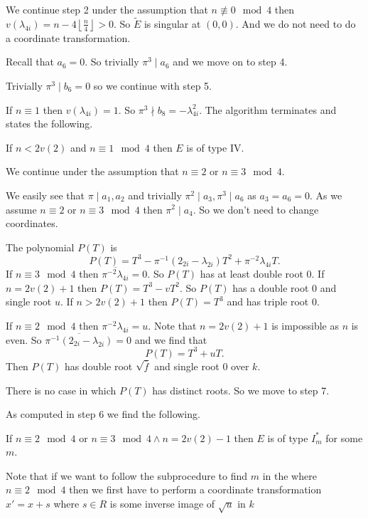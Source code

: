 We continue step 2 under the assumption that $n \not\equiv 0 \mod 4$ then $v(\lambda_{4i}) = n - 4 \left\lfloor \frac{n}{4} \right\rfloor >  0$. 
So $\tilde E$ is singular at $(0, 0)$. And we do not need to do a coordinate transformation. 



Recall that $a_6 = 0$. So trivially $\pi^3 \mid a_6$ and we move on to step 4.

Trivially $\pi^3 \mid b_6 = 0$ so we continue with step 5.

If $n \equiv 1$ then $v(\lambda_{4i}) = 1$. So $\pi^3 \nmid b_8 = - \lambda_{4i}^2$. 
The algorithm terminates and states the following. 
\begin{tateconclusion}
	If $n < 2v(2)$ and $n \equiv 1 \mod 4$ then $E$ is of type  $\mathrm {IV}$. 
\end{tateconclusion}
We continue under the assumption that $n \equiv 2$ or $n \equiv 3 \mod 4$. 

We easily see that $\pi \mid a_1, a_2$ and trivially $\pi^2 \mid a_3, \pi^3 \mid a_6$ as $a_3 = a_6 = 0$. 
As we assume $n \equiv 2$ or $n \equiv 3 \mod 4$ then $\pi^2 \mid a_4$. 
So we don't need to change coordinates. 

The polynomial $P(T)$ is \[
	P(T) = T^3  -\pi^{-1}(2_{2i} - \lambda_{2i})T^2 + \pi^{-2}\lambda_{4i} T
.\] 
If $n \equiv 3 \mod 4$ then $\overline{\pi^{-2} \lambda_{4i}} = 0$. 
So $P(T)$ has at least double root $0$.
If $n = 2v(2) + 1$ then  $P(T) = T^3 - vT^2$. So $P(T)$ has a double root $0$ and single root $u$. 
If $n > 2v(2) + 1$ then $P(T) = T^3$ and has triple root $0$. 

If $n \equiv 2 \mod 4$ then $\pi^{-2} \lambda_{4i} = u$. 
Note that $n = 2v(2) +1 $ is impossible as $n$ is even. So $\overline{\pi^{-1} (2_{2i} - \lambda_{2i})} = 0$ and we find that \[
	P(T) = T^3 + u T
.\] 
Then $P(T)$ has double root $\sqrt{\overline{f}} $ and single root $0$ over $k$.

There is no case in which $P(T)$ has distinct roots. So we move to step 7.

As computed in step 6 we find the following. 
\begin{tateconclusion}
	If $n \equiv 2 \mod 4$ or $n \equiv 3 \mod 4 \wedge n = 2v(2) - 1$ then $E$ is of type $I_m^*$ for some $m$. 
\end{tateconclusion}

Note that if we want to follow the subprocedure to find $m$ in the where $n \equiv 2 \mod 4$ then we first have to perform a coordinate transformation $x' = x + s$ where $s \in R$ is some inverse image of $\sqrt{u} $ in $k$

